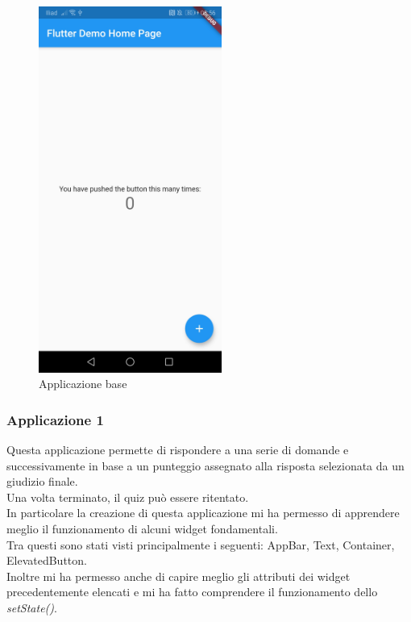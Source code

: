 \begin{figure}[htbp]	
	\centering
	\includegraphics[width=6cm]{immagini/base.jpeg}
	\caption{Applicazione base}
	\label{fig:Applicazione base}
\end{figure}

\newpage

\subsubsection{Applicazione 1}
Questa applicazione permette di rispondere a una serie di domande e successivamente in base a un punteggio assegnato alla risposta selezionata da un giudizio finale.\\
Una volta terminato, il quiz può essere ritentato.\\
In particolare la creazione di questa applicazione mi ha permesso di apprendere meglio il funzionamento di alcuni widget fondamentali.\\
Tra questi sono stati visti principalmente i seguenti: AppBar, Text, Container, ElevatedButton.\\
Inoltre mi ha permesso anche di capire meglio gli attributi dei widget precedentemente elencati e mi ha fatto comprendere il funzionamento dello \textit{setState()}.\\

